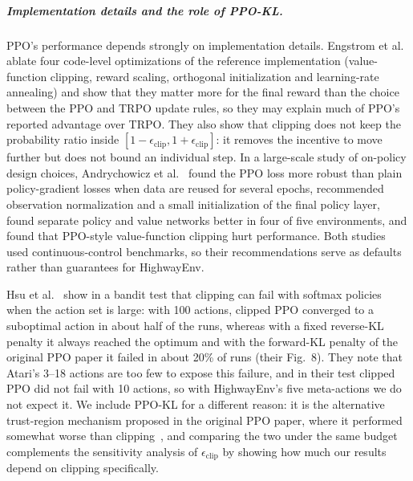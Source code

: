 \subparagraph{Implementation details and the role of PPO-KL.}
PPO's performance depends strongly on implementation details. Engstrom et al.~\cite{engstrom2020implementation}
ablate four code-level optimizations of the reference implementation (value-function clipping, reward scaling,
orthogonal initialization and learning-rate annealing) and show that they matter more for the final reward than the
choice between the PPO and TRPO update rules, so they may explain much of PPO's reported advantage over TRPO. They also
show that clipping does not keep the probability ratio inside $[1-\epsilon_{\mathrm{clip}}, 1+\epsilon_{\mathrm{clip}}]$:
it removes the incentive to move further but does not bound an individual step. In a large-scale study of on-policy
design choices, Andrychowicz et al.~\cite{andrychowicz2021matters} found the PPO loss more robust than plain
policy-gradient losses when data are reused for several epochs, recommended observation normalization and a small
initialization of the final policy layer, found separate policy and value networks better in four of five
environments, and found that PPO-style value-function clipping hurt performance. Both studies used continuous-control
benchmarks, so their recommendations serve as defaults rather than guarantees for HighwayEnv.

Hsu et al.~\cite{hsu2020revisiting} show in a bandit test that clipping can fail with softmax policies when the action
set is large: with 100 actions, clipped PPO converged to a suboptimal action in about half of the runs, whereas with a
fixed reverse-KL penalty it always reached the optimum and with the forward-KL penalty of the original PPO paper it
failed in about 20\% of runs (their Fig.~8). They note that Atari's 3--18 actions are too few to expose this failure,
and in their test clipped PPO did not fail with 10 actions, so with HighwayEnv's five meta-actions we do not expect it.
We include PPO-KL for a different reason: it is the alternative trust-region mechanism proposed in the original PPO
paper, where it performed somewhat worse than clipping~\cite{schulman2017ppo}, and comparing the two under the same
budget complements the sensitivity analysis of $\epsilon_{\mathrm{clip}}$ by showing how much our results depend on
clipping specifically.

